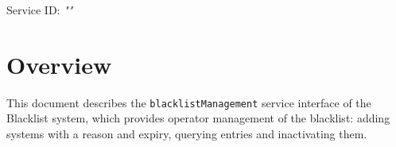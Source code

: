 \documentclass[a4paper]{arrowhead}
\begin{document}
\sloppy

\ArrowheadSetup

\begin{center}
  \vspace*{1cm}
  \huge{\arrowtitle}

  \vspace*{0.2cm}
  \LARGE{\arrowtype}
  \vspace*{1cm}

  \Large{Service ID: \textit{"\arrowid"}}

  \vspace*{\fill}


  \vspace*{1cm}
  \vspace*{\fill}

  \begin{abstract}
    This document describes the HTTP/1.1 protocol with TLS payload security and JSON payload encoding variant of the \texttt{blacklist\allowbreak{}Management} service of the Blacklist system.
  \end{abstract}

  \vspace*{1cm}
\end{center}

\newpage

\tableofcontents
\newpage

\section{Overview}
\label{sec:overview}

This document describes the \texttt{blacklist\allowbreak{}Management} service interface of the Blacklist system, which provides operator management of the blacklist: adding systems with a reason and expiry, querying entries and inactivating them.
\end{document}
